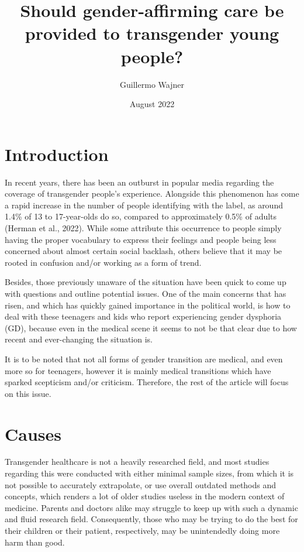\documentclass{article}
\begin{document}
\title{Should gender-affirming care be provided to transgender young people?}

\author{Guillermo Wajner}

\date{August 2022}

\setlength{\parindent}{0.5in}
\setlength{\parskip}{0.2in}

\maketitle

\section{Introduction}

In recent years, there has been an outburst in popular media regarding the coverage of transgender people’s experience. Alongside this phenomenon has come a rapid increase in the number of people identifying with the label, as around 1.4\% of 13 to 17-year-olds do so, compared to approximately 0.5\% of adults (Herman et al., 2022). While some attribute this occurrence to people simply having the proper vocabulary to express their feelings and people being less concerned about almost certain social backlash, others believe that it may be rooted in confusion and/or working as a form of trend.\par

Besides, those previously unaware of the situation have been quick to come up with questions and outline potential issues. One of the main concerns that has risen, and which has quickly gained importance in the political world, is how to deal with these teenagers and kids who report experiencing gender dysphoria (GD), because even in the medical scene it seems to not be that clear due to how recent and ever-changing the situation is.\par

It is to be noted that not all forms of gender transition are medical, and even more so for teenagers, however it is mainly medical transitions which have sparked scepticism and/or criticism. Therefore, the rest of the article will focus on this issue.

\section{Causes}

Transgender healthcare is not a heavily researched field, and most studies regarding this were conducted with either minimal sample sizes, from which it is not possible to accurately extrapolate, or use overall outdated methods and concepts, which renders a lot of older studies useless in the modern context of medicine. Parents and doctors alike may struggle to keep up with such a dynamic and fluid research field. Consequently, those who may be trying to do the best for their children or their patient, respectively, may be unintendedly doing more harm than good.\par
\end{document}
